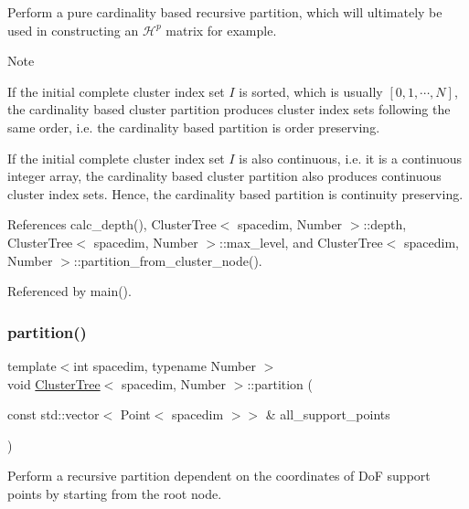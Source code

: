 Perform a pure cardinality based recursive partition, which will ultimately be used in constructing an $\mathcal{H}^p$ matrix for example.


\begin{DoxyDescription}
\item[Note ]
\begin{DoxyEnumerate}
\item If the initial complete cluster index set $I$ is sorted, which is usually $[0, 1, \cdots, N]$, the cardinality based cluster partition produces cluster index sets following the same order, i.\+e. the cardinality based partition is order preserving.
\item If the initial complete cluster index set $I$ is also continuous, i.\+e. it is a continuous integer array, the cardinality based cluster partition also produces continuous cluster index sets. Hence, the cardinality based partition is continuity preserving.  
\end{DoxyEnumerate}
\end{DoxyDescription}

References calc\+\_\+depth(), Cluster\+Tree$<$ spacedim, Number $>$\+::depth, Cluster\+Tree$<$ spacedim, Number $>$\+::max\+\_\+level, and Cluster\+Tree$<$ spacedim, Number $>$\+::partition\+\_\+from\+\_\+cluster\+\_\+node().



Referenced by main().

\mbox{\label{classClusterTree_a5657415b4b0519f045f3139d1d63e85d}} 
\subsubsection{\texorpdfstring{partition()}{partition()}\hspace{0.1cm}{\footnotesize\ttfamily [2/3]}}
{\footnotesize\ttfamily template$<$int spacedim, typename Number $>$ \\
void \hyperlink{classClusterTree}{Cluster\+Tree}$<$ spacedim, Number $>$\+::partition (\begin{DoxyParamCaption}\item[{const std\+::vector$<$ Point$<$ spacedim $>$$>$ \&}]{all\+\_\+support\+\_\+points }\end{DoxyParamCaption})}

Perform a recursive partition dependent on the coordinates of DoF support points by starting from the root node.


